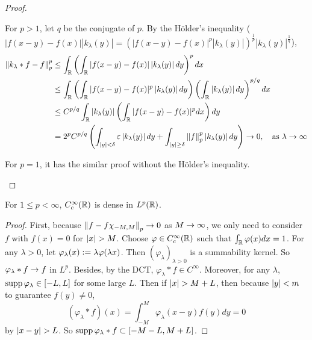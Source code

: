 \begin{enumerate}[label=\arabic*.]
\begin{proof}
\begin{enumerate}[label=(\arabic{*})]
			\noindent For $p > 1$, let $q$ be the conjugate of $p$. By the H\"older's inequality ($|f(x-y)-f(x)|\left|k_\lambda(y)\right| = (|f(x-y)-f(x)|^p\left|k_\lambda(y)\right|)^\frac{1}{p}\left|k_\lambda(y)\right|^\frac{1}{q}$),
			\begin{equation*}
				\begin{aligned}
					\left\|k_\lambda * f-f\right\|_p^p &\leq \int_{\mathbb{R}}\left(\int_{\mathbb{R}}|f(x-y)-f(x)|\left|k_\lambda(y)\right| d y\right)^p d x \\
					&\leq \int_{\mathbb{R}}\left(\int_{\mathbb{R}}|f(x-y)-f(x)|^p\left|k_\lambda(y)\right| d y\right)\left(\int_{\mathbb{R}}\left|k_\lambda(y)\right| d y\right)^{p / q} d x \\
					&\leq C^{p / q}\int_{\mathbb{R}}\left|k_\lambda(y)\right|\left(\int_{\mathbb{R}}|f(x-y)-f(x)|^p d x\right)dy \\
					&= 2^pC^{p / q} \left(\int_{\left\lvert y\right\lvert < \delta}\varepsilon \left\lvert k_\lambda (y)\right\lvert dy + \int_{\left\lvert y\right\lvert \geq \delta} \left\lVert f\right\lVert_p^p \left\lvert k_\lambda(y)\right\lvert dy\right) \rightarrow 0,\quad \text{as } \lambda \rightarrow \infty
				\end{aligned}
			\end{equation*}

			\noindent For $p =1$, it has the similar proof without the H\"older's inequality.

		\end{enumerate}
	\end{proof}

	\begin{cor}
		For $1 \leq p < \infty$, $C_c^\infty(\mathbb{R})$ is dense in $L^p(\mathbb{R})$.
	\end{cor}
	\begin{proof}
		First, because $\left\lVert f - f\chi_{-M,M}\right\lVert_p \rightarrow 0$ as $M \rightarrow \infty$, we only need to consider $f$ with $f(x) = 0$ for $\left\lvert x\right\lvert > M$. Choose $\varphi \in C_c^\infty(\mathbb{R})$ such that $\int_{\mathbb{R}} \varphi(x) dx = 1$. For any $\lambda > 0$, let $\varphi_\lambda(x) \vcentcolon= \lambda\varphi(\lambda x)$. Then $(\varphi_\lambda)_{\lambda > 0}$ is a summability kernel. So $\varphi_\lambda * f \rightarrow f$ in $L^p$. Besides, by the DCT, $\varphi_\lambda * f \in C^\infty$. Moreover, for any $\lambda$, $\operatorname{supp} \varphi_\lambda \in [-L,L]$ for some large $L$. Then if $\left\lvert x\right\lvert > M+L$, then because $\left\lvert y\right\lvert < m$ to guarantee $f(y) \neq 0$,
		\begin{equation*}
			\left(\varphi_\lambda * f\right)(x)=\int_{-M}^M \varphi_\lambda(x-y) f(y) d y=0
		\end{equation*}
		by $\left\lvert x - y\right\lvert > L$. So $\operatorname{supp} \varphi_\lambda * f \subset [-M-L,M+L]$.
	\end{proof}


\end{enumerate}
